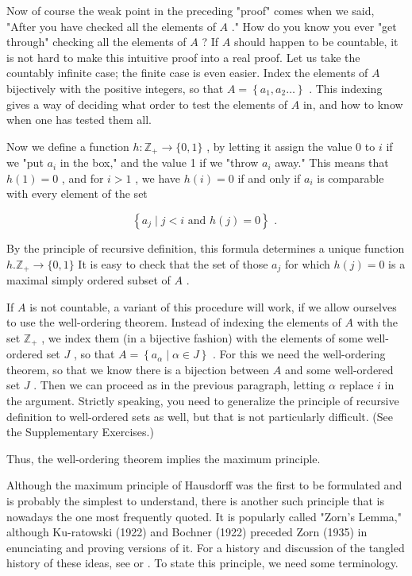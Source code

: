 Now of course the weak point in the preceding "proof" comes when we said, "After you have checked all the elements of \(A\) ." How do you know you ever "get through" checking all the elements of \(A\) ? If \(A\) should happen to be countable, it is not hard to make this intuitive proof into a real proof. Let us take the countably infinite case; the finite case is even easier. Index the elements of \(A\) bijectively with the positive integers, so that \(A = \left\{  {{a}_{1},{a}_{2}\ldots }\right\}\) . This indexing gives a way of deciding what order to test the elements of \(A\) in, and how to know when one has tested them all.

Now we define a function \(h : {\mathbb{Z}}_{ + } \rightarrow  \{ 0,1\}\) , by letting it assign the value 0 to \(i\) if we "put \({a}_{i}\) in the box," and the value 1 if we "throw \({a}_{i}\) away." This means that \(h\left( 1\right)  = 0\) , and for \(i > 1\) , we have \(h\left( i\right)  = 0\) if and only if \({a}_{i}\) is comparable with every element of the set

\[
\left\{  {{a}_{j} \mid  j < i\text{ and }h\left( j\right)  = 0}\right\}  \text{ . }
\]

By the principle of recursive definition, this formula determines a unique function \(h.{\mathbb{Z}}_{ + } \rightarrow  \{ 0,1\}\) It is easy to check that the set of those \({a}_{j}\) for which \(h\left( j\right)  = 0\) is a maximal simply ordered subset of \(A\) .

If \(A\) is not countable, a variant of this procedure will work, if we allow ourselves to use the well-ordering theorem. Instead of indexing the elements of \(A\) with the set \({\mathbb{Z}}_{ + }\) , we index them (in a bijective fashion) with the elements of some well-ordered set \(J\) , so that \(A = \left\{  {{a}_{\alpha } \mid  \alpha  \in  J}\right\}\) . For this we need the well-ordering theorem, so that we know there is a bijection between \(A\) and some well-ordered set \(J\) . Then we can proceed as in the previous paragraph, letting \(\alpha\) replace \(i\) in the argument. Strictly speaking, you need to generalize the principle of recursive definition to well-ordered sets as well, but that is not particularly difficult. (See the Supplementary Exercises.)

Thus, the well-ordering theorem implies the maximum principle.

Although the maximum principle of Hausdorff was the first to be formulated and is probably the simplest to understand, there is another such principle that is nowadays the one most frequently quoted. It is popularly called "Zorn's Lemma," although Ku-ratowski (1922) and Bochner (1922) preceded Zorn (1935) in enunciating and proving versions of it. For a history and discussion of the tangled history of these ideas, see \cite{Campbell1978} or \cite{Moore1982}. To state this principle, we need some terminology.

